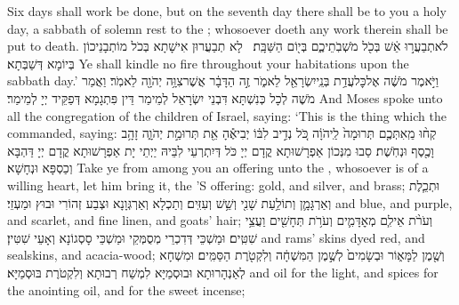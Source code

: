 {Six days shall work be done, but on the seventh day there shall be to you a holy day, a sabbath of solemn rest to the \lord; whosoever doeth any work therein shall be put to death.}{}
{לֹא\maqqaf תְבַעֲר֣וּ אֵ֔שׁ בְּכֹ֖ל מֹשְׁבֹֽתֵיכֶ֑ם בְּי֖וֹם הַשַּׁבָּֽת׃ \petucha }
{לָא תְבַעֲרוּן אִישָׁתָא בְּכֹל מוֹתְבָנֵיכוֹן בְּיוֹמָא דְּשַׁבְּתָא׃}
{Ye shall kindle no fire throughout your habitations upon the sabbath day.’}{}
{וַיֹּ֣אמֶר מֹשֶׁ֔ה אֶל\maqqaf כׇּל\maqqaf עֲדַ֥ת בְּנֵֽי\maqqaf יִשְׂרָאֵ֖ל לֵאמֹ֑ר זֶ֣ה הַדָּבָ֔ר אֲשֶׁר\maqqaf צִוָּ֥ה יְהֹוָ֖ה לֵאמֹֽר׃}
{וַאֲמַר מֹשֶׁה לְכָל כְּנִשְׁתָּא דִּבְנֵי יִשְׂרָאֵל לְמֵימַר דֵּין פִּתְגָמָא דְּפַקֵּיד יְיָ לְמֵימַר׃}
{And Moses spoke unto all the congregation of the children of Israel, saying: ‘This is the thing which the \lord\space commanded, saying:}{}
{קְח֨וּ מֵֽאִתְּכֶ֤ם תְּרוּמָה֙ לַֽיהֹוָ֔ה כֹּ֚ל נְדִ֣יב לִבּ֔וֹ יְבִיאֶ֕הָ אֵ֖ת תְּרוּמַ֣ת יְהֹוָ֑ה זָהָ֥ב וָכֶ֖סֶף וּנְחֹֽשֶׁת׃}
{סַבוּ מִנְּכוֹן אַפְרָשׁוּתָא קֳדָם יְיָ כֹּל דְּיִתְרְעֵי לִבֵּיהּ יַיְתֵי יָת אַפְרָשׁוּתָא קֳדָם יְיָ דַּהְבָּא וְכַסְפָּא וּנְחָשָׁא׃}
{Take ye from among you an offering unto the \lord, whosoever is of a willing heart, let him bring it, the \lord’S offering: gold, and silver, and brass;}{}
{וּתְכֵ֧לֶת וְאַרְגָּמָ֛ן וְתוֹלַ֥עַת שָׁנִ֖י וְשֵׁ֥שׁ וְעִזִּֽים׃}
{וְתַכְלָא וְאַרְגְּוָנָא וּצְבַע זְהוֹרִי וּבוּץ וּמַעְזֵי׃}
{and blue, and purple, and scarlet, and fine linen, and goats’ hair;}{}
{וְעֹרֹ֨ת אֵילִ֧ם מְאׇדָּמִ֛ים וְעֹרֹ֥ת תְּחָשִׁ֖ים וַעֲצֵ֥י שִׁטִּֽים׃}
{וּמַשְׁכֵּי דְּדִכְרֵי מְסֻמְּקֵי וּמַשְׁכֵּי סָסְגוֹנָא וְאָעֵי שִׁטִּין׃}
{and rams’ skins dyed red, and sealskins, and acacia-wood;}{}
{וְשֶׁ֖מֶן לַמָּא֑וֹר וּבְשָׂמִים֙ לְשֶׁ֣מֶן הַמִּשְׁחָ֔ה וְלִקְטֹ֖רֶת הַסַּמִּֽים׃}
{וּמִשְׁחָא לְאַנְהָרוּתָא וּבוּסְמַיָּא לִמְשַׁח רְבוּתָא וְלִקְטֹרֶת בּוּסְמַיָּא׃}
{and oil for the light, and spices for the anointing oil, and for the sweet incense;}{}
